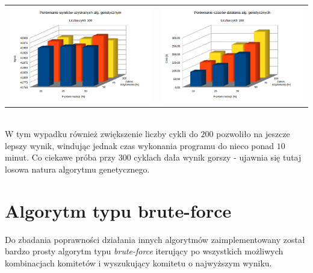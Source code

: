 \documentclass[pdflatex,11pt]{../aghdoc_version2}
\begin{document}
\begin{tabular}{cc}
\includegraphics[width=0.4\paperwidth]{pics/porownanie2/wynik100.png} & 
\includegraphics[width=0.4\paperwidth]{pics/porownanie2/czas100.png} \\
		
\end{tabular}

~ \\
W tym wypadku również zwiększenie liczby cykli do $200$ pozwoliło na jeszcze lepszy wynik, windując jednak czas wykonania programu do nieco ponad $10$ minut. Co ciekawe próba przy $300$ cyklach dała wynik gorszy - ujawnia się tutaj losowa natura algorytmu genetycznego.

\section{Algorytm typu brute-force}
Do zbadania poprawności działania innych algorytmów zaimplementowany został bardzo prosty algorytm typu \textit{brute-force} iterujący po wszystkich możliwych kombinacjach komitetów i wyszukujący komitetu o najwyższym wyniku.
\end{document}
